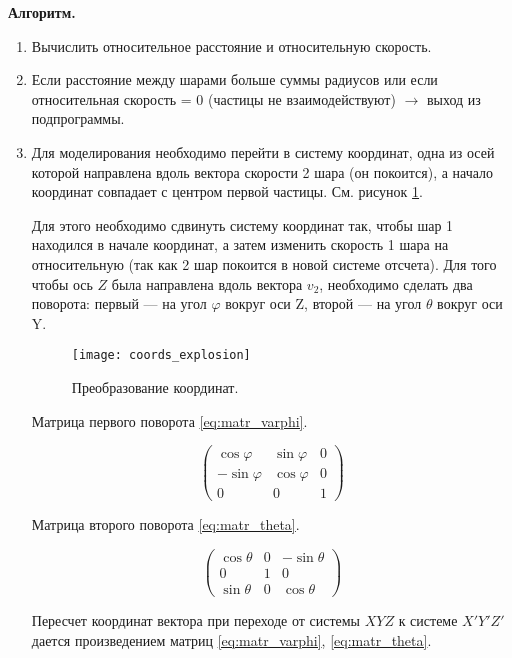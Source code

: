 \textbf{Алгоритм. }
\begin{enumerate}
	\item Вычислить относительное расстояние и относительную скорость. 
	
	\item Если расстояние между шарами больше суммы радиусов или если относительная скорость = 0 (частицы не взаимодействуют) $\to$ выход из подпрограммы. 
	
	\item Для моделирования необходимо перейти в систему координат, одна из осей которой направлена вдоль вектора скорости 2 шара (он покоится), а начало координат совпадает с центром первой частицы. См. рисунок  \ref{img:coords_explosion}. 
	
	Для этого необходимо сдвинуть систему координат так, чтобы шар 1 находился в начале координат, а затем изменить скорость 1 шара на относительную (так как 2 шар покоится в новой системе отсчета). Для того чтобы ось $Z$ была направлена вдоль вектора $v_2$, необходимо сделать два поворота: первый --- на угол $\varphi$ вокруг оси Z, второй --- на угол $\theta$ вокруг оси Y.
	
	\begin{figure}[H]
		\centering
		\texttt{[image: coords\_explosion]}
		\caption{Преобразование координат. }
		\label{img:coords_explosion}
	\end{figure}
	
	Матрица первого поворота \ref{eq:matr_varphi}. 
	
	\begin{equation}
		\begin{pmatrix}
			\cos{\varphi}& \sin{\varphi} & 0\\
			-\sin{\varphi}& \cos{\varphi} & 0\\
			0&0&1
		\end{pmatrix}
		\label{eq:matr_varphi}
	\end{equation}
	
	Матрица второго поворота \ref{eq:matr_theta}. 
	
	\begin{equation}
		\begin{pmatrix}
			\cos{\theta}& 0 & -\sin{\theta}\\
			0& 1 & 0\\
			\sin{\theta}&0&\cos{\theta}
		\end{pmatrix}
		\label{eq:matr_theta}
	\end{equation}
	
	Пересчет координат вектора при переходе от системы $XYZ$ к системе $X'Y'Z'$ дается произведением матриц \ref{eq:matr_varphi}, \ref{eq:matr_theta}. 
	

\end{enumerate}
